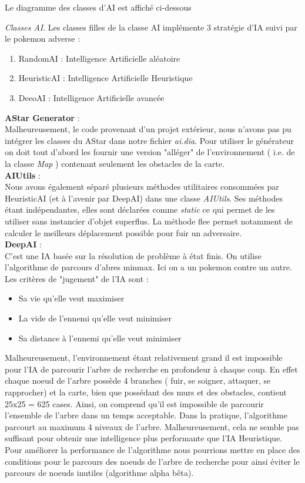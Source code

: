 \documentclass[a4paper,12pt]{article}
\begin{document}
    Le diagramme des classes d'AI est affiché ci-dessous
    
    \emph{Classes AI}. Les classes filles de la classe AI implémente 3 stratégie d'IA suivi par le pokemon adverse :\begin{enumerate}
      
\item RandomAI : Intelligence Artificielle aléatoire
\item HeuristicAI :  Intelligence Artificielle Heuristique
\item DeeoAI : Intelligence Artificielle avancée
    \end{enumerate}
    \textbf{AStar Generator} :
    \\Malheureusement, le code provenant d'un projet extérieur, nous n'avons pas pu intégrer les classes du AStar dans notre fichier \emph{ai.dia}.
    Pour utiliser le générateur on doit tout d'abord les fournir une version "alléger" de l'environnement ( i.e. de la classe \emph{Map} ) contenant seulement les obstacles de la carte.
   \\\textbf{AIUtils} :
   \\Nous avons également séparé plusieurs méthodes utilitaires consommées par HeuristicAI (et à l'avenir par DeepAI) dans une classe \emph{AIUtils}. Ses méthodes étant indépendantes, elles sont déclarées comme \emph{static} ce qui permet de les utiliser sans instancier d'objet superflus. 
   La méthode flee permet notamment de calculer le meilleurs déplacement possible pour fuir un adversaire.
    \\\textbf{DeepAI} :
	\\C'est une IA basée sur la résolution de problème à état finis. On utilise l'algorithme de parcours d'abres minmax. Ici on a un pokemon contre un autre.  Les critères de "jugement" de l'IA sont :
    \begin{itemize}
    \item     Sa vie qu'elle veut  maximiser
\item La vide de l'ennemi  qu'elle veut minimiser
\item Sa distance à l'ennemi qu'elle veut minimiser
    \end{itemize}
    Malheureusement, l'environnement étant relativement grand il est impossible pour l'IA de parcourir l'arbre de recherche en profondeur à chaque coup. En effet chaque noeud de l'arbre possède 4 branches ( fuir, se soigner, attaquer, se rapprocher) et la carte, bien que possédant des murs et des obstacles, contient 25x25 = 625 cases. Ainsi, on comprend qu'il est impossible de parcourir l'ensemble de l'arbre dans un temps acceptable. 
    Dans la pratique, l'algorithme parcourt au maximum 4 niveaux de l'arbre. Malheureusement, cela ne semble pas suffisant pour obtenir une intelligence plus performante que l'IA Heuristique. 
    Pour améliorer la performance de l'algorithme nous pourrions mettre en place des conditions pour le parcours des noeuds de l'arbre de recherche pour ainsi éviter le parcours de noeuds inutiles (algorithme alpha bêta). 
\end{document}
